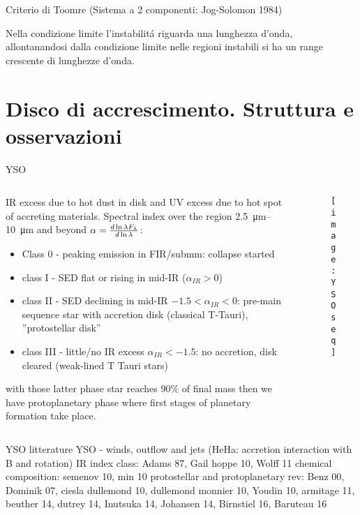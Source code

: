 \begin{wordonframe}{Criterio di Toomre}
(Sistema a 2 componenti: Jog-Solomon 1984)

Nella condizione limite l'instabilit\'a riguarda una lunghezza d'onda, allontanandosi dalla condizione limite nelle regioni instabili si ha un range crescente di lunghezze d'onda.

\end{wordonframe}

\section{Disco di accrescimento. Struttura e osservazioni}

\begin{frame}{YSO}
\begin{columns}[T]\begin{column}{0.65\textwidth}
IR excess due to hot dust in disk and UV excess due to hot spot of accreting materials. Spectral index over the region \SIrange{2.5}{10}{\micro\meter} and beyond $\alpha=\frac{d \ln{\lambda F_{\lambda}}}{d \ln{\lambda}}$: \begin{itemize}
\item Class 0 - peaking emission in FIR/submm: collapse started
\item class I - SED flat or rising in mid-IR ($\alpha_{IR}>0$)
\item class II - SED declining in mid-IR $-1.5<\alpha_{IR}<0$: pre-main sequence star with accretion disk (classical T-Tauri), ''protostellar disk''
\item class III - little/no IR excess $\alpha_{IR}<-1.5$: no accretion, disk cleared (weak-lined T Tauri stars)
\end{itemize}
with those latter phase star reaches $90\%$ of final mass then we have protoplanetary phase where first stages of planetary formation take place.
\end{column}\begin{column}{0.35\textwidth}
\begin{figure}[!ht]\texttt{[image: YSOseq]}\label{fig:YSOseq}\end{figure} 
\end{column}\end{columns}
\end{frame}

\begin{wordonframe}{YSO litterature}
YSO - winds, outflow and jets (HeHa: accretion interaction with B and rotation)
IR index class: Adams 87, Gail hoppe 10, Wolff 11
chemical composition: semenov 10, min 10
protostellar and protoplanetary rev: Benz 00, Dominik 07, ciesla dullemond 10, dullemond monnier 10, Youdin 10, armitage 11, beuther 14, dutrey 14, Inutsuka 14, Johansen 14, Birnstiel 16, Baruteau 16
\end{wordonframe}

